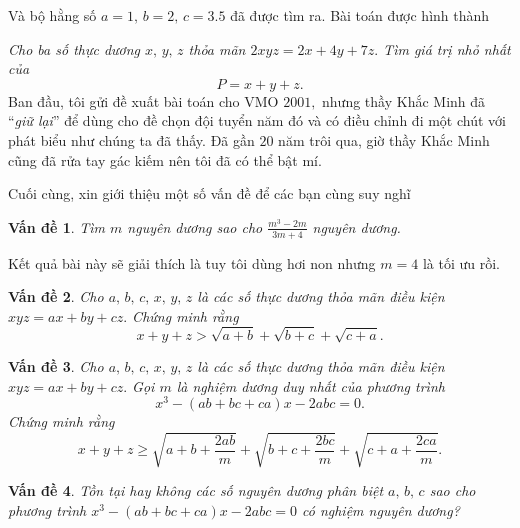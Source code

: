 \documentclass[12pt,a4paper]{book}
\newtheorem{vande}{\cmss\problemColor Vấn đề}
\begin{document}
Và bộ hằng số $a =1,\,b=2,\,c=3.5$ đã được tìm ra. Bài toán được hình thành

\textit{Cho ba số thực dương $x,\,y,\,z$ thỏa mãn $2 x y z=2 x+4 {y}+7 {z}.$ Tìm giá trị nhỏ nhất của}
$${P}={x}+{y}+{z}.$$
Ban đầu, tôi gửi đề xuất bài toán cho VMO $2001,$ nhưng thầy Khắc Minh đã “\textit{giữ lại}” để dùng cho đề chọn đội tuyển năm đó và có điều chỉnh đi một chút với phát biểu như chúng ta đã thấy. Đã gần $20$ năm trôi qua, giờ thầy Khắc Minh cũng đã rửa tay gác kiếm nên tôi đã có thể bật mí.

Cuối cùng, xin giới thiệu một số vấn đề để các bạn cùng suy nghĩ

\begin{vande}
Tìm $m$ nguyên dương sao cho $\frac{m^{3}-2 m}{3 m+4}$ nguyên dương.
\end{vande}

Kết quả bài này sẽ giải thích là tuy tôi dùng hơi non nhưng $m = 4$ là tối ưu rồi.

\begin{vande}
Cho $a,\,b,\, c,\, x,\, y,\, z$ là các số thực dương thỏa mãn điều kiện $xyz = ax +by +cz.$ Chứng minh rằng
$$x+y+z>\sqrt{a+b}+\sqrt{b+c}+\sqrt{c+a}.$$
\end{vande}

\begin{vande}
Cho $a,\,b,\, c,\, x,\, y,\, z$ là các số thực dương thỏa mãn điều kiện $xyz = ax +by +cz.$ Gọi $m$ là nghiệm dương duy nhất của phương trình
$$x^{3}-(a b+b c+c a) x-2 a b c=0.$$
Chứng minh rằng
$$x+y+z \geq \sqrt{a+b+\frac{2 a b}{m}}+\sqrt{b+c+\frac{2 b c}{m}}+\sqrt{c+a+\frac{2 c a}{m}}.$$
\end{vande}

\begin{vande}
Tồn tại hay không các số nguyên dương phân biệt $a,\,b,\,c$ sao cho phương trình $x^{3}-(a b+b c+c a) x-2 a b c=0$ có nghiệm nguyên dương?
\end{vande}
\end{document}
